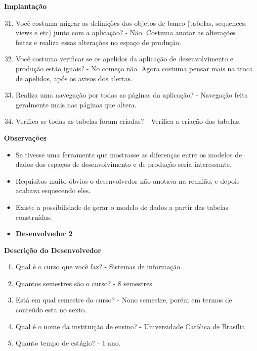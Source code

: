 \begin{anexosenv}
\textbf{Implantação}

\begin{enumerate}
\setcounter{enumi}{30}
\item Você costuma migrar as definições dos objetos de banco (tabelas, sequences, views e
etc) junto com a aplicação?\newline
- Não. Costuma anotar as alterações feitas e realiza essas alterações no espaço de produção.
\item Você costuma verificar se os apelidos da aplicação de desenvolvimento e produção
estão iguais?\newline
- No começo não. Agora costuma pensar mais na troca de apelidos, após os avisos dos alertas.
\item Realiza uma navegação por todas as páginas da aplicação?\newline
- Navegação feita geralmente mais nas páginas que altera.
\item Verifica se todas as tabelas foram criadas?\newline
- Verifica a criação das tabelas.
\end{enumerate}

\textbf{Observações}

\begin{itemize}
\item Se tivesse uma ferramente que mostrasse as diferenças entre os modelos de dados dos espaços de desenvolvimento e de produção seria interessante.
\item Requisitos muito óbvios o desenvolvedor não anotava na reunião, e depois acabava esquecendo eles.
\item Existe a possibilidade de gerar o modelo de dados a partir das tabelas construídas.
\end{itemize}


\begin{itemize}
\item \textbf{Desenvolvedor 2}
\end{itemize}

\textbf{Descrição do Desenvolvedor}

\begin{enumerate}
\item Qual é o curso que você faz?\newline
- Sistemas de informação.
\item Quantos semestres são o curso?\newline
- 8 semestres.
\item Está em qual semestre do curso?\newline
- Nono semestre, porém em termos de conteúdo esta no sexto.
\item Qual é o nome da instituição de ensino?\newline
- Universidade Católica de Brasília.
\item Quanto tempo de estágio?\newline
- 1 ano.
\end{enumerate}


\end{anexosenv}
